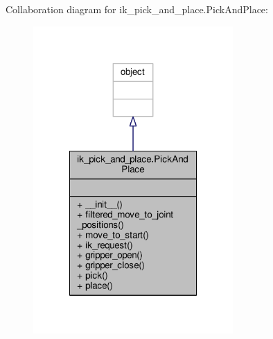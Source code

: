 Collaboration diagram for ik\-\_\-pick\-\_\-and\-\_\-place.\-Pick\-And\-Place\-:\nopagebreak
\begin{figure}[H]
\begin{center}
\leavevmode
\includegraphics[width=216pt]{classik__pick__and__place_1_1_pick_and_place__coll__graph}
\end{center}
\end{figure}
